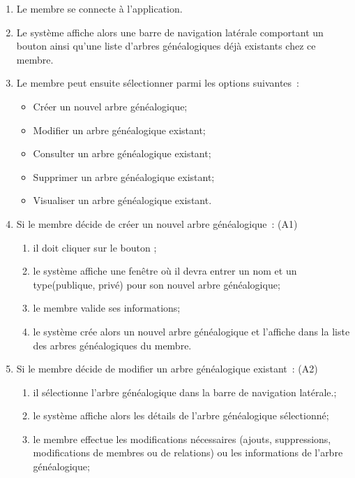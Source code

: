 \begin{enumerate}

  \item Le membre se connecte à l’application.

  \item Le système affiche alors une barre de navigation latérale comportant un
    bouton  ainsi qu’une liste d’arbres généalogiques déjà
    existants chez ce membre.

  \item Le membre peut ensuite sélectionner parmi les options suivantes :
    \begin{itemize}
      \item Créer un nouvel arbre généalogique;
      \item Modifier un arbre généalogique existant;
      \item Consulter un arbre généalogique existant;
      \item Supprimer un arbre généalogique existant;
      \item Visualiser un arbre généalogique existant.
    \end{itemize}

  \item Si le membre décide de créer un nouvel arbre généalogique : (A1)
    \begin{enumerate}
      \item il doit cliquer sur le bouton ;
      \item le système affiche une fenêtre où il devra entrer un nom et un type(publique, privé)
        pour son nouvel arbre généalogique;
      \item le membre valide ses informations;
      \item le système crée alors un nouvel arbre généalogique et l’affiche dans la liste des arbres
        généalogiques du membre.
    \end{enumerate}

  \item  Si le membre décide de modifier un arbre généalogique existant : (A2)
    \begin{enumerate}
      \item il sélectionne l’arbre généalogique dans la barre de navigation latérale.;
      \item le système affiche alors les détails de l’arbre généalogique sélectionné;
      \item le membre effectue les modifications nécessaires (ajouts,
        suppressions, modifications de membres ou de relations) ou les
        informations de l’arbre généalogique;


\end{enumerate}
\end{enumerate}
